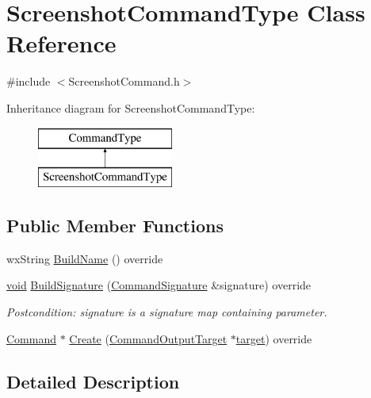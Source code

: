 \hypertarget{class_screenshot_command_type}{}\section{Screenshot\+Command\+Type Class Reference}
\label{class_screenshot_command_type}


{\ttfamily \#include $<$Screenshot\+Command.\+h$>$}

Inheritance diagram for Screenshot\+Command\+Type\+:\begin{figure}[H]
\begin{center}
\leavevmode
\includegraphics[height=2.000000cm]{class_screenshot_command_type}
\end{center}
\end{figure}
\subsection*{Public Member Functions}
\begin{DoxyCompactItemize}
\item 
wx\+String \hyperlink{class_screenshot_command_type_ab035a95c6b760ad6dc4eb912e6ffcd57}{Build\+Name} () override
\item 
\hyperlink{sound_8c_ae35f5844602719cf66324f4de2a658b3}{void} \hyperlink{class_screenshot_command_type_a38ace9151c577628b173a3a7b5034fd2}{Build\+Signature} (\hyperlink{class_command_signature}{Command\+Signature} \&signature) override
\begin{DoxyCompactList}\small\item\em Postcondition\+: signature is a \textquotesingle{}signature\textquotesingle{} map containing parameter. \end{DoxyCompactList}\item 
\hyperlink{class_command}{Command} $\ast$ \hyperlink{class_screenshot_command_type_a6b66a23486604dced6d0aa5d9f4bad52}{Create} (\hyperlink{class_command_output_target}{Command\+Output\+Target} $\ast$\hyperlink{lib_2expat_8h_a15a257516a87decb971420e718853137}{target}) override
\end{DoxyCompactItemize}


\subsection{Detailed Description}


